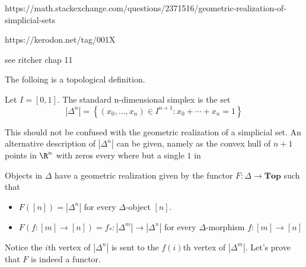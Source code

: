 \lipsum[2]

https://math.stackexchange.com/questions/2371516/geometric-realization-of-simplicial-sets

https://kerodon.net/tag/001X

see ritcher chap 11



The folloing is a topological definition.
\begin{definition}
    Let \(I = [0,1]\). The standard n-dimensional simplex is the set
    \[|{\Delta}^n| = \left\{ (x_0, \dots, x_n)\in I^{n+1 } :  x_0 + \cdots + x_n = 1 \right\}\]
\end{definition}
\begin{remark}
    This should not be confused with the geometric realization of a simplicial set.
    An alternative description of \(|\Delta^n|\)    can be given, namely as the convex hull of \(n+1\) points in \(\R^n\) with zeros every where but a single \(1\) in 
\end{remark}


Objects in \(\Delta\) have a geometric realization given by the  functor \(F\colon \Delta \to \mathbf{Top}\) such that 
\begin{itemize}
    \item \(F([n]) = |\Delta^n|\) for every \(\Delta\)-object \([n]\).
    \item \(F(f\colon [m] \to [n]) = f_*\colon |\Delta^m| \to |\Delta^n| \) for every \(\Delta\)-morphism \(f\colon [m]\to [n]\)
\end{itemize} 
Notice the \(i\)th vertex of \(|\Delta^n|\) is sent to the \(f(i)\)th vertex of \(|\Delta^m|\). 
Let's prove that \(F\) is indeed a functor.



